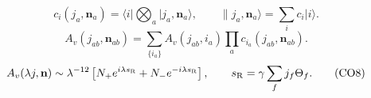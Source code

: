 \documentclass{article}
\newcommand{\ket}[1]{\lvert #1\rangle}
\newcommand{\bra}[1]{\langle #1\rvert}
\begin{document}
\begin{equation}
c_i(j_a,\mathbf n_a)=\bra i\bigotimes_a\ket{j_a,\mathbf n_a},\qquad\|j_a,\mathbf n_a\rangle=\sum_i c_i\ket i.
\tag{CO6}
\end{equation}
\begin{equation}
A_v(j_{ab},\mathbf n_{ab})=\sum_{\{i_a\}}A_v(j_{ab},i_a)\prod_ac_{i_a}(j_{ab},\mathbf n_{ab}).
\tag{CO7}
\end{equation}
\begin{equation}
A_v(\lambda j,\mathbf n)\sim\lambda^{-12}\left[N_+e^{i\lambda s_{\rm R}}+N_-e^{-i\lambda s_{\rm R}}\right],\qquad s_{\rm R}=\gamma\sum_fj_f\Theta_f.
\tag{CO8}
\end{equation}
\end{document}
